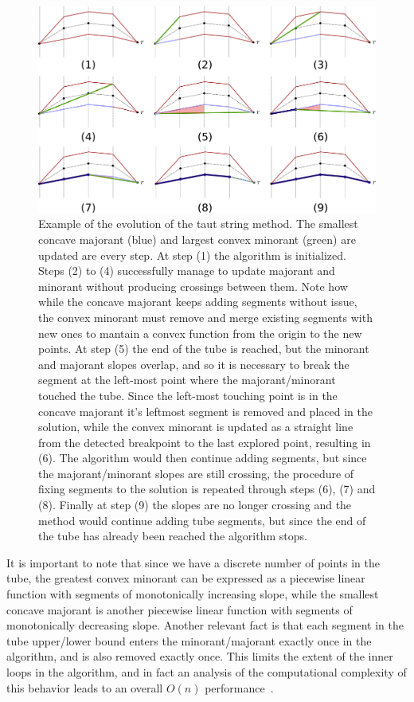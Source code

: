 \documentclass[twoside,11pt]{article}
\numberwithin{equation}{section}
\numberwithin{theorem}{section}
\begin{document}
\begin{figure}[ht]
  \centering
  \includegraphics[width = \textwidth]{classictautstringrun}
  \caption{\small Example of the evolution of the taut string method. The smallest concave majorant (blue) and largest convex minorant (green) are updated are every step. At step (1) the algorithm is initialized. Steps (2) to (4) successfully manage to update majorant and minorant without producing crossings between them. Note how while the concave majorant keeps adding segments without issue, the convex minorant must remove and merge existing segments with new ones to mantain a convex function from the origin to the new points. At step (5) the end of the tube is reached, but the minorant and majorant slopes overlap, and so it is necessary to break the segment at the left-most point where the majorant/minorant touched the tube. Since the left-most touching point is in the concave majorant it's leftmost segment is removed and placed in the solution, while the convex minorant is updated as a straight line from the detected breakpoint to the last explored point, resulting in (6). The algorithm would then continue adding segments, but since the majorant/minorant slopes are still crossing, the procedure of fixing segments to the solution is repeated through steps (6), (7) and (8). Finally at step (9) the slopes are no longer crossing and the method would continue adding tube segments, but since the end of the tube has already been reached the algorithm stops.
   }   \label{fig:classictautstringrun}
\end{figure}

It is important to note that since we have a discrete number of points in the tube, the greatest convex minorant can be expressed as a piecewise linear function with segments of monotonically increasing slope, while the smallest concave majorant is another piecewise linear function with segments of monotonically decreasing slope. Another relevant fact is that each segment in the tube upper/lower bound enters the minorant/majorant exactly once in the algorithm, and is also removed exactly once. This limits the extent of the inner loops in the algorithm, and in fact an analysis of the computational complexity of this behavior leads to an overall $O(n)$ performance~\citep{daviesTautString}.
\end{document}
